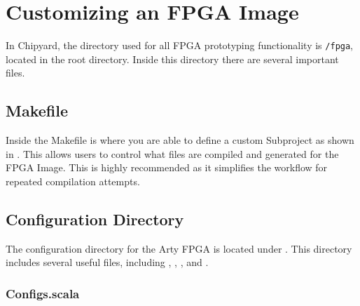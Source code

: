 \section{Customizing an FPGA Image}\label{sec:Customizing}
In Chipyard, the directory used for all FPGA prototyping functionality is \texttt{/fpga}, located in the root directory. 
Inside this directory there are several important files.

\subsection{Makefile}
Inside the Makefile is where you are able to define a custom Subproject as shown in . 
This allows users to control what files are compiled and generated for the FPGA Image. 
This is highly recommended as it simplifies the workflow for repeated compilation attempts.

\subsection{Configuration Directory}
The configuration directory for the Arty FPGA is located under . 
This directory includes several useful files, including , , , and .

\subsubsection{Configs.scala}
